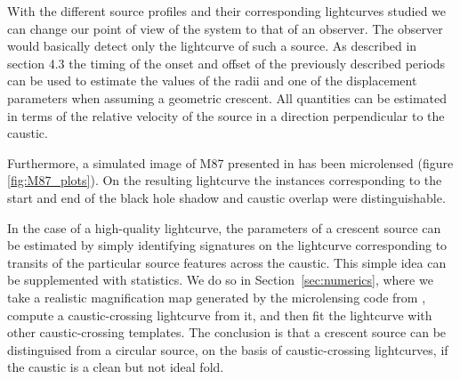 \documentclass[usenatbib]{mn2e}
\begin{document}
With the different source profiles and their corresponding lightcurves 
studied we can change our point of view of the system to that of an observer. 
The observer would basically detect only the lightcurve of such a source.
 As described in section 4.3 the timing of the onset and 
offset of the previously 
described periods can be used to estimate the values of the radii 
and one of the displacement parameters when assuming a geometric crescent. 
All quantities can be estimated in terms of the relative velocity 
of the source in a direction perpendicular to the caustic.


Furthermore, a simulated image of M87 presented in
 \citep{2012MNRAS.421.1517D} has been microlensed (figure \ref{fig:M87_plots}). 
On the resulting lightcurve the instances 
corresponding to the start and end of the black hole 
shadow and caustic overlap were distinguishable.
    
In the case of a high-quality lightcurve, the parameters of a crescent
source can be estimated by simply identifying signatures on the
lightcurve corresponding to transits of the particular source features
across the caustic.  This simple idea can be supplemented with
statistics.  We do so in Section~\ref{sec:numerics}, where we take a
realistic magnification map generated by the microlensing code
from \cite{1999A&A...346L...5W}, compute a caustic-crossing lightcurve
from it, and then fit the lightcurve with other caustic-crossing
templates.  The conclusion is that a crescent source can be
distinguised from a circular source, on the basis of caustic-crossing
lightcurves, if the caustic is a clean but not ideal fold.
\end{document}
